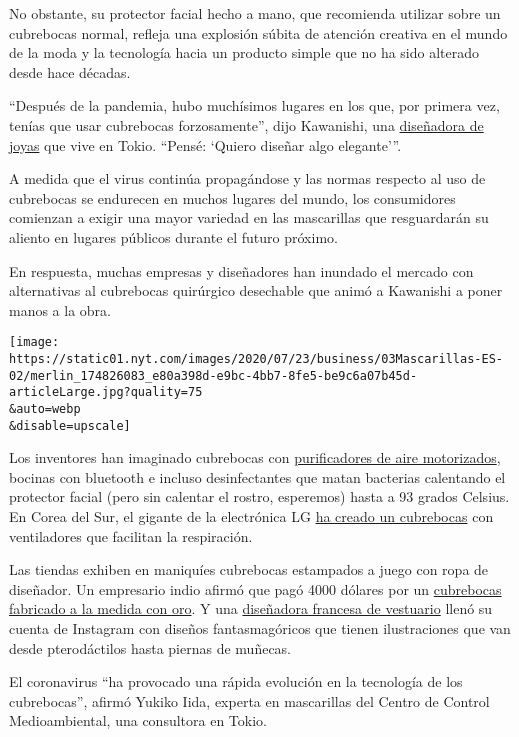 No obstante, su protector facial hecho a mano, que recomienda utilizar
sobre un cubrebocas normal, refleja una explosión súbita de atención
creativa en el mundo de la moda y la tecnología hacia un producto simple
que no ha sido alterado desde hace décadas.

``Después de la pandemia, hubo muchísimos lugares en los que, por
primera vez, tenías que usar cubrebocas forzosamente'', dijo Kawanishi,
una \href{https://www.instagram.com/sprbyspecialr/?hl=en}{diseñadora de
joyas} que vive en Tokio. ``Pensé: `Quiero diseñar algo elegante'''.

A medida que el virus continúa propagándose y las normas respecto al uso
de cubrebocas se endurecen en muchos lugares del mundo, los consumidores
comienzan a exigir una mayor variedad en las mascarillas que
resguardarán su aliento en lugares públicos durante el futuro próximo.

En respuesta, muchas empresas y diseñadores han inundado el mercado con
alternativas al cubrebocas quirúrgico desechable que animó a Kawanishi a
poner manos a la obra.

\texttt{[image: https://static01.nyt.com/images/2020/07/23/business/03Mascarillas-ES-02/merlin\_174826083\_e80a398d-e9bc-4bb7-8fe5-be9c6a07b45d-articleLarge.jpg?quality=75\\\&auto=webp\\\&disable=upscale]}

Los inventores han imaginado cubrebocas con
\href{https://prtimes.jp/main/html/rd/p/000000559.000032456.html}{purificadores
de aire motorizados}, bocinas con bluetooth e incluso desinfectantes que
matan bacterias calentando el protector facial (pero sin calentar el
rostro, esperemos) hasta a 93 grados Celsius. En Corea del Sur, el
gigante de la electrónica LG
\href{https://asia.nikkei.com/Business/Electronics/LG-debuts-fan-powered-mask-to-ease-breathing}{ha
creado un cubrebocas} con ventiladores que facilitan la respiración.

Las tiendas exhiben en maniquíes cubrebocas estampados a juego con ropa
de diseñador. Un empresario indio afirmó que pagó 4000 dólares por un
\href{https://www.scmp.com/news/asia/south-asia/article/3091866/coronavirus-bling-bling-indian-businessman-wears-us4000-custom}{cubrebocas
fabricado a la medida con oro}. Y una
\href{https://www.instagram.com/sophiecochevelou/}{diseñadora francesa
de vestuario} llenó su cuenta de Instagram con diseños fantasmagóricos
que tienen ilustraciones que van desde pterodáctilos hasta piernas de
muñecas.

El coronavirus ``ha provocado una rápida evolución en la tecnología de
los cubrebocas'', afirmó Yukiko Iida, experta en mascarillas del Centro
de Control Medioambiental, una consultora en Tokio.


